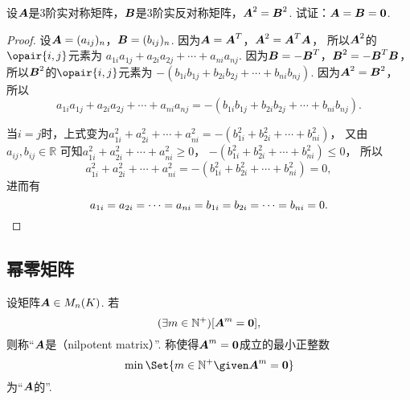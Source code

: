\begin{example}
设\(\boldsymbol{A}\)是3阶实对称矩阵，\(\boldsymbol{B}\)是3阶实反对称矩阵，\(\boldsymbol{A}^2 = \boldsymbol{B}^2\).
试证：\(\boldsymbol{A} = \boldsymbol{B} = \boldsymbol0\).
\begin{proof}
设\(\boldsymbol{A} = (a_{ij})_n\)，\(\boldsymbol{B} = (b_{ij})_n\).
因为\(\boldsymbol{A} = \boldsymbol{A}^T\)，\(\boldsymbol{A}^2 = \boldsymbol{A}^T \boldsymbol{A}\)，
所以\(\boldsymbol{A}^2\)的\(\opair{i,j}\)元素为
\(a_{1i} a_{1j} + a_{2i} a_{2j} + \dotsb + a_{ni} a_{nj}\).
因为\(\boldsymbol{B} = -\boldsymbol{B}^T\)，\(\boldsymbol{B}^2 = -\boldsymbol{B}^T \boldsymbol{B}\)，
所以\(\boldsymbol{B}^2\)的\(\opair{i,j}\)元素为
\(-(b_{1i} b_{1j} + b_{2i} b_{2j} + \dotsb + b_{ni} b_{nj})\).
因为\(\boldsymbol{A}^2 = \boldsymbol{B}^2\)，
所以\[
	a_{1i} a_{1j} + a_{2i} a_{2j} + \dotsb + a_{ni} a_{nj}
	= -(b_{1i} b_{1j} + b_{2i} b_{2j} + \dotsb + b_{ni} b_{nj}).
\]

当\(i=j\)时，上式变为\(a_{1i}^2 + a_{2i}^2 + \dotsb + a_{ni}^2
= -(b_{1i}^2 + b_{2i}^2 + \dotsb + b_{ni}^2)\)，
又由\(a_{ij},b_{ij} \in \mathbb{R}\)
可知\(a_{1i}^2 + a_{2i}^2 + \dotsb + a_{ni}^2 \geq 0\)，
\(-(b_{1i}^2 + b_{2i}^2 + \dotsb + b_{ni}^2) \leq 0\)，
所以\[
	a_{1i}^2 + a_{2i}^2 + \dotsb + a_{ni}^2
	= -(b_{1i}^2 + b_{2i}^2 + \dotsb + b_{ni}^2) = 0,
\]
进而有\[
	a_{1i} = a_{2i} = \dotsb = a_{ni} = b_{1i} = b_{2i} = \dotsb = b_{ni} = 0.
	\qedhere
\]
\end{proof}
\end{example}

\subsection{幂零矩阵}

\begin{definition}
设矩阵\(\boldsymbol{A} \in M_n(K)\).
若\[
	(\exists m\in\mathbb{N}^+)
	[\boldsymbol{A}^m = \boldsymbol0],
\]
则称“\(\boldsymbol{A}\)是（nilpotent matrix）”.
称使得\(\boldsymbol{A}^m = \boldsymbol0\)成立的最小正整数\[
    \min\Set{ m\in\mathbb{N}^+ \given \vb{A}^m = \vb0 }
\]为“\(\boldsymbol{A}\)的”.
\end{definition}

